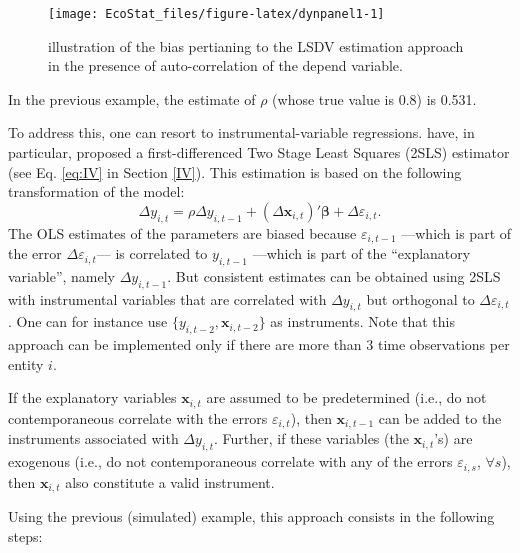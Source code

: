 \documentclass[
  12pt,
]{book}
\theoremstyle{definition}
\theoremstyle{definition}
\theoremstyle{definition}
\theoremstyle{definition}
\theoremstyle{remark}
\begin{document}
\begin{figure}
\texttt{[image: EcoStat\_files/figure-latex/dynpanel1-1]} \caption{illustration of the bias pertianing to the LSDV estimation approach in the presence of auto-correlation of the depend variable.}\label{fig:dynpanel1}
\end{figure}

In the previous example, the estimate of \(\rho\) (whose true value is 0.8) is 0.531.

To address this, one can resort to instrumental-variable regressions. \citet{Anderson_Hsiao_1982} have, in particular, proposed a first-differenced Two Stage Least Squares (2SLS) estimator (see Eq. \eqref{eq:IV} in Section \ref{IV}). This estimation is based on the following transformation of the model:
\begin{equation}
\Delta y_{i,t} = \rho \Delta y_{i,t-1} + (\Delta \mathbf{x}_{i,t})'\boldsymbol\beta + \Delta\varepsilon_{i,t}.\label{eq:paneldynFisrtDiff}
\end{equation}
The OLS estimates of the parameters are biased because \(\varepsilon_{i,t-1}\) ---which is part of the error \(\Delta\varepsilon_{i,t}\)--- is correlated to \(y_{i,t-1}\) ---which is part of the ``explanatory variable'', namely \(\Delta y_{i,t-1}\). But consistent estimates can be obtained using 2SLS with instrumental variables that are correlated with \(\Delta y_{i,t}\) but orthogonal to \(\Delta\varepsilon_{i,t}\). One can for instance use \(\{y_{i,t-2},\mathbf{x}_{i,t-2}\}\) as instruments. Note that this approach can be implemented only if there are more than 3 time observations per entity \(i\).

If the explanatory variables \(\mathbf{x}_{i,t}\) are assumed to be predetermined (i.e., do not contemporaneous correlate with the errors \(\varepsilon_{i,t}\)), then \(\mathbf{x}_{i,t-1}\) can be added to the instruments associated with \(\Delta y_{i,t}\). Further, if these variables (the \(\mathbf{x}_{i,t}\)'s) are exogenous (i.e., do not contemporaneous correlate with any of the errors \(\varepsilon_{i,s}\), \(\forall s\)), then \(\mathbf{x}_{i,t}\) also constitute a valid instrument.

Using the previous (simulated) example, this approach consists in the following steps:
\end{document}
